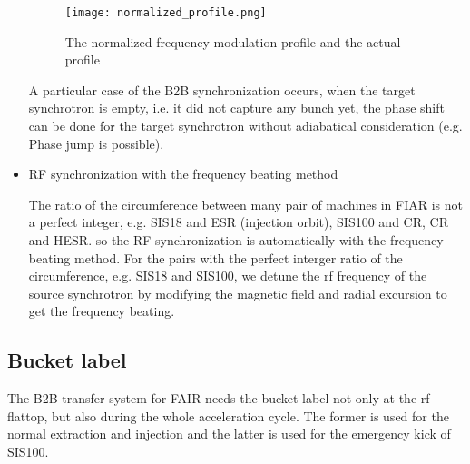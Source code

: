 \begin{itemize}
\begin{figure}[!htb]
   \centering   
   \texttt{[image: normalized\_profile.png]}
   \caption{The normalized frequency modulation profile and the actual profile}
   \label{normalized_profile}
\end{figure}  

A particular case of the B2B synchronization occurs, when the target synchrotron is empty, i.e. it did not capture any bunch yet, the phase shift can be done for the target synchrotron without adiabatical consideration (e.g. Phase jump is possible).

\item RF synchronization with the frequency beating method

The ratio of the circumference between many pair of machines in FIAR is not a perfect integer, e.g. SIS18 and ESR (injection orbit), SIS100 and CR, CR and HESR. so the RF synchronization is automatically with the frequency beating method. For the pairs with the perfect interger ratio of the circumference, e.g. SIS18 and SIS100, we detune the rf frequency of the source synchrotron by modifying the magnetic field and radial excursion to get the frequency beating.


\end{itemize}
\subsection{Bucket label}
The B2B transfer system for FAIR needs the bucket label not only at the rf flattop, but also during the whole acceleration cycle. The former is used for the normal extraction and injection and the latter is used for the emergency kick of SIS100. 

